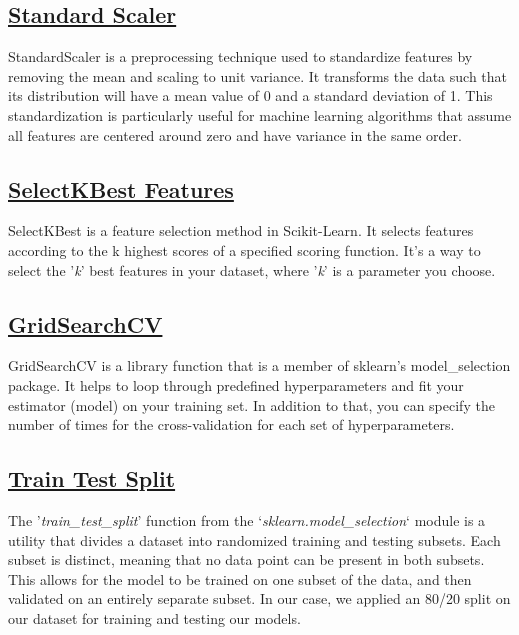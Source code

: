 \documentclass[conference]{IEEEtran}
\begin{document}
    \subsection*{\href{https://scikit-learn.org/stable/modules/generated/sklearn.preprocessing.StandardScaler.html}{Standard Scaler}}
    StandardScaler is a preprocessing technique used to standardize features by removing the mean and scaling to unit variance. It transforms the data such that its distribution will have a mean value of 0 and a standard deviation of 1. This standardization is particularly useful for machine learning algorithms that assume all features are centered around zero and have variance in the same order.

    \subsection*{\href{https://scikit-learn.org/stable/modules/generated/sklearn.feature_selection.SelectKBest.html}{SelectKBest Features}}
    SelectKBest is a feature selection method in Scikit-Learn. It selects features according to the k highest scores of a specified scoring function. It's a way to select the '\textit{k}' best features in your dataset, where '\textit{k}' is a parameter you choose.

    \subsection*{\href{https://scikit-learn.org/stable/modules/generated/sklearn.model_selection.GridSearchCV.html}{GridSearchCV}}
    GridSearchCV is a library function that is a member of sklearn's model\_selection package. It helps to loop through predefined hyperparameters and fit your estimator (model) on your training set. In addition to that, you can specify the number of times for the cross-validation for each set of hyperparameters.

    \subsection*{\href{https://scikit-learn.org/stable/modules/generated/sklearn.model_selection.train_test_split.html}{Train Test Split}}
    The '\textit{train\_test\_split}' function from the `\textit{sklearn.model\_selection}` module is a utility that divides a dataset into randomized training and testing subsets. Each subset is distinct, meaning that no data point can be present in both subsets. This allows for the model to be trained on one subset of the data, and then validated on an entirely separate subset. In our case, we applied an 80/20 split on our dataset for training and testing our models.
\end{document}
